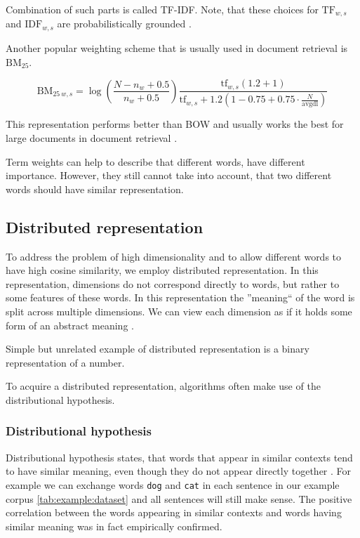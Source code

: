     Combination of such parts is called TF-IDF.
    Note, that these choices for $\mathrm{TF}_{w,s}$ and $\mathrm{IDF}_{w,s}$ are probabilistically grounded \cite{aizawa2003information}. %
    
    Another popular weighting scheme that is usually used in document retrieval is $\mathrm{BM_{25}}$. 
    
    $$\mathrm{BM}_{25~w,s} = \log \left(\frac{N-n_w+0.5}{n_w + 0.5}\right)    \frac{\mathrm{tf}_{w,s} (1.2 + 1)}{\mathrm{tf}_{w,s} + 1.2  \left(1 - 0.75 + 0.75 \cdot \frac{N}{\text{avgdl}}\right)}$$
    
    This representation performs better than BOW and usually works the best for large documents in document retrieval \cite{li2014semantic}.
    
    Term weights can help to describe that different words, have different importance.
    However, they still cannot take into account, that two different words should have similar representation.
    
    
    \subsection{Distributed representation}
    
    To address the problem of high dimensionality and to allow different words to have high cosine similarity, we employ distributed representation.
    In this representation, dimensions do not correspond directly to words, but rather to some features of these words.
    In this representation the ''meaning`` of the word is split across multiple dimensions.
    We can view each dimension as if it holds some form of an abstract meaning \cite{le2014distributed}. 
    
    Simple but unrelated example of distributed representation is a binary representation of a number.
    
    To acquire a distributed representation, algorithms often make use of the distributional hypothesis.

    \subsubsection{Distributional hypothesis}
    
    Distributional hypothesis states, that words that appear in similar contexts tend to have similar meaning,
    even though they do not appear directly together \cite{harris1954distributional} \cite{Rubenstein:1965:CCS:365628.365657}. %
    For example we can exchange words \texttt{dog} and \texttt{cat} in each sentence in our example corpus \ref{tab:example:dataset}
    and all sentences will still make sense. 
    The positive correlation between the words appearing in similar contexts and words having similar meaning was in fact empirically confirmed.
    
